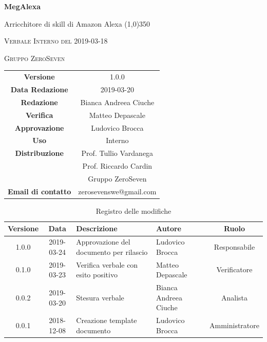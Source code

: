 \documentclass[a4paper,12pt]{article}
\author{Bianca Andreea Ciuche}
\date{2019-03-20}
\begin{document}
	\begin{titlepage}
		\centering
		{\huge\bfseries MegAlexa\par}
		Arricchitore di skill di Amazon Alexa
		\line(1,0){350} \\
		{\scshape\LARGE Verbale Interno del 2019-03-18 \par}
		\vspace{1cm}
		{\scshape Gruppo ZeroSeven \par}
		\logo
		\begin{tabular}{c|c}
			{\hfill \textbf{Versione}} 			& 1.0.0				\\
			{\hfill\textbf{Data Redazione}} 	& 2019-03-20		\\ 
			{\hfill\textbf{Redazione}} 			&  		Bianca Andreea Ciuche		\\ 
			{\hfill\textbf{Verifica}} 				&  	 Matteo Depascale \\ 
			{\hfill\textbf{Approvazione}} 		&  Ludovico Brocca\\ 
			{\hfill\textbf{Uso}} 					& 	Interno	\\ 
			{\hfill\textbf{Distribuzione}} 			& 			Prof. Tullio Vardanega \\ & Prof. Riccardo Cardin \\ & Gruppo ZeroSeven 	\\ 
			{\hfill\textbf{Email di contatto}} & zerosevenswe@gmail.com \\
		\end{tabular}
	\end{titlepage}
	
	
	
	\label{LastFrontPage}
	
	
	\newpage
	\cleardoublepage
	\begin{table}[tbph]
		\centering
		\begin{tabularx}{\textwidth}{|c|c|X|X|c|}
			\hline
			\textbf{Versione} & \textbf{Data} & \textbf{Descrizione} & \textbf{Autore} & \textbf{Ruolo} \\
			\hline
			1.0.0 & 2019-03-24 & Approvazione del documento per rilascio& Ludovico Brocca &  Responsabile \\
			\hline
			0.1.0 & 2019-03-23 & Verifica verbale con esito positivo & Matteo Depascale  & Verificatore \\
			\hline
			0.0.2 & 2019-03-20 & Stesura verbale &Bianca Andreea Ciuche  & Analista \\
			\hline
			0.0.1 & 2018-12-08 & Creazione template documento & Ludovico Brocca & Amministratore\\
			\hline
		\end{tabularx}
		\caption{Registro delle modifiche}
	\end{table}
	\cleardoublepage
	\pagestyle{mymain}
	
\end{document}

